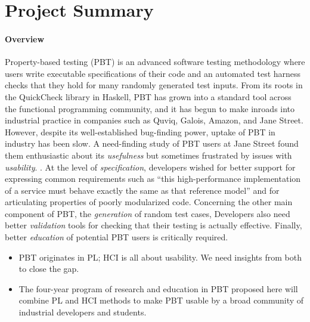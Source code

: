 \section*{Project Summary}


\paragraph*{Overview}
Property-based testing (PBT) is an advanced software testing
methodology where users write executable specifications of their code
and an automated test harness checks that they hold for many randomly
generated test inputs.  From its roots in the QuickCheck library in
Haskell, PBT has grown into a standard tool across the functional
programming community, and it has begun to make inroads into
industrial practice in companies such as Quviq, Galois, Amazon, and
Jane Street.
%
However, despite its well-established bug-finding power, uptake of PBT
in industry has been slow.  A need-finding study of PBT users at Jane
Street found them enthusiastic about its {\em usefulness} but
sometimes frustrated by issues with {\em usability}.
%
.
%
At the level of {\em specification}, developers wished for better
support for expressing common requirements such as ``this
high-performance implementation of a service must behave exactly the
same as that reference model'' and for articulating properties of
poorly modularized code.
% 
Concerning the other main component of PBT, the {\em generation} of
random test cases, 
%
Developers also need better {\em validation} tools for checking
that their testing is actually effective.
%
Finally, better {\em education} of potential PBT users is critically
required.


\begin{itemize}
\item PBT originates in PL; HCI is all about usability.  We need
insights from both to close the gap.
\item The four-year program of research and education in
PBT proposed here will combine PL and HCI methods to make PBT usable by a broad
community of industrial developers and students.
\end{itemize}

